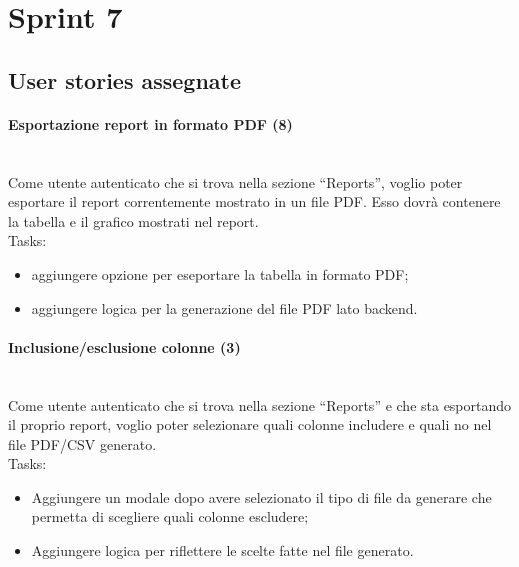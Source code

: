 
\section{Sprint 7}
\label{sec:sprint7}

\subsection{User stories assegnate}

\paragraph{Esportazione report in formato PDF (8)}\mbox{} \\[\baselineskip]
Come utente autenticato che si trova nella sezione “Reports”, voglio poter esportare il report correntemente mostrato in un file PDF.
Esso dovrà contenere la tabella e il grafico mostrati nel report.\\

\noindent Tasks:
\begin{itemize}
  \item aggiungere opzione per eseportare la tabella in formato PDF;
  \item aggiungere logica per la generazione del file PDF lato backend.
\end{itemize}

\paragraph{Inclusione/esclusione colonne (3)}\mbox{} \\[\baselineskip]
Come utente autenticato che si trova nella sezione “Reports” e che sta esportando il proprio report, voglio poter selezionare quali colonne includere e quali no nel file PDF/CSV generato.\\

\noindent Tasks:
\begin{itemize}
  \item Aggiungere un modale dopo avere selezionato il tipo di file da generare che permetta di scegliere quali colonne escludere;
  \item Aggiungere logica per riflettere le scelte fatte nel file generato.
\end{itemize}

